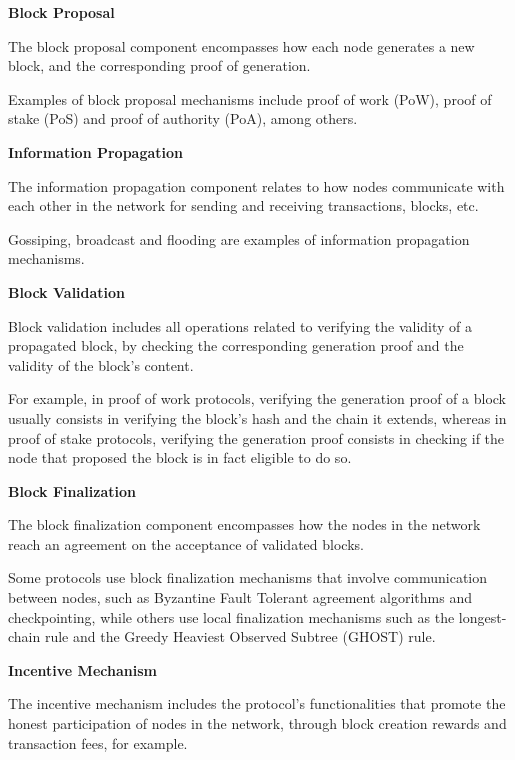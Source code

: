\textbf{Block Proposal}

The block proposal component encompasses how each node generates a new block, and the corresponding proof of generation.

Examples of block proposal mechanisms include proof of work (PoW), proof of stake (PoS) and proof of authority (PoA), among others.

\vspace{0.25cm}


\textbf{Information Propagation}

The information propagation component relates to how nodes communicate with each other in the network for sending and receiving transactions, blocks, etc.

Gossiping, broadcast and flooding are examples of information propagation mechanisms.

\vspace{0.25cm}

\textbf{Block Validation}

Block validation includes all operations related to verifying the validity of a propagated block, by checking the corresponding generation proof and the validity of the block’s content.

For example, in proof of work protocols, verifying the generation proof of a block usually consists in verifying the block’s hash and the chain it extends, whereas in proof of stake protocols, verifying the generation proof consists in checking if the node that proposed the block is in fact eligible to do so.

\vspace{0.25cm}

\textbf{Block Finalization}

The block finalization component encompasses how the nodes in the network reach an agreement on the acceptance of validated blocks.

Some protocols use block finalization mechanisms that involve communication between nodes, such as Byzantine Fault Tolerant agreement algorithms and checkpointing, while others use local finalization mechanisms such as the longest-chain rule and the Greedy Heaviest Observed Subtree (GHOST) rule.

\vspace{0.25cm}

\textbf{Incentive Mechanism}

The incentive mechanism includes the protocol’s functionalities that promote the honest participation of nodes in the network, through block creation rewards and transaction fees, for example.






